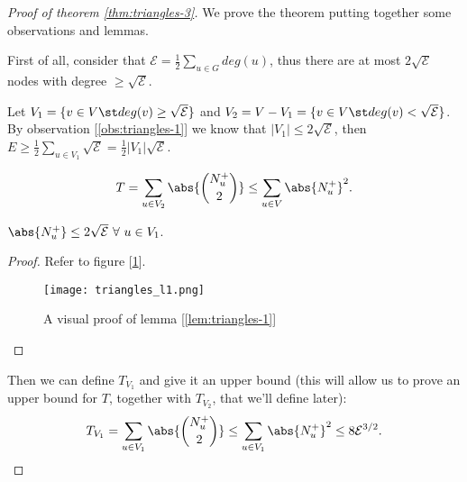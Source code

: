 \begin{proof}[Proof of theorem \ref{thm:triangles-3}]
    We prove the theorem putting together some observations and lemmas.
    
    \begin{obs}\label{obs:triangles-1}
        First of all, consider that $\mathcal{E} = \frac12 \sum_{u \in G} deg(u)$, thus there are at most $2 \sqrt{\mathcal{E}}$ nodes with degree $\geq \sqrt{\mathcal{E}}$.
    \end{obs}
    
    Let $V_1 = \{ v \in V \st deg(v) \geq \sqrt{\mathcal{E}} \}$ and $V_2 = V - V_1 = \{ v \in V \st deg(v) < \sqrt{\mathcal{E}} \}$.\\
    By observation [\ref{obs:triangles-1}] we know that $|V_1| \leq 2 \sqrt{\mathcal{E}}$, then $E \geq \frac12 \sum_{u \in V_1} \sqrt{\mathcal{E}} = \frac12 |V_1| \sqrt{\mathcal{E}}$.
    
    \begin{obs}\label{obs:triangles-2}
        \begin{equation}\label{eq:triangles-t}
            T = \sum_{u \in V_2} \abs{\binom{N_u^+}{2}} \leq \sum_{u \in V} \abs{N_u^+}^2.
        \end{equation}
    \end{obs} %

    \begin{lem}\label{lem:triangles-1}
        $\abs{N_u^+} \leq 2 \sqrt{\mathcal{E}}\ \forall\ u \in V_1$.
    \end{lem}
    \begin{proof}
        Refer to figure [\ref{fig:triangles-l1}].
        
        \begin{figure}[h!]
            \centering
            \texttt{[image: triangles\_l1.png]}
            \caption{A visual proof of lemma [\ref{lem:triangles-1}]}
            \label{fig:triangles-l1}
        \end{figure}
    \end{proof}

    Then we can define $T_{V_1}$ and give it an upper bound (this will allow us to prove an upper bound for $T$, together with $T_{V_2}$, that we'll define later):
    \begin{equation}\label{eq:triangles-tv1}
        T_{V_1} = \sum_{u \in V_1} \abs{\binom{N_u^+}{2}} \leq \sum_{u \in V_1} \abs{N_u^+}^2 \leq 8 \mathcal{E}^{3/2}.
    \end{equation}
    

\end{proof}
